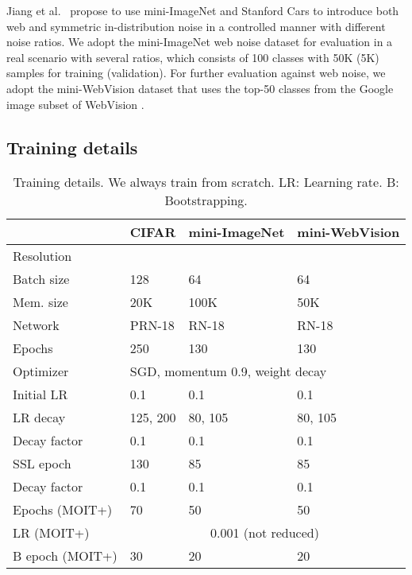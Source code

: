 \documentclass[final]{cvpr}
\begin{document}
Jiang et al.~\cite{2020_ICML_DatasetOOD} propose to use mini-ImageNet and Stanford Cars to introduce both web and symmetric in-distribution
noise in a controlled manner with different noise ratios. We adopt the mini-ImageNet web noise dataset for evaluation in a real scenario with several ratios, which consists of 100 classes with 50K (5K) samples for training (validation). For further evaluation against web noise, we adopt the mini-WebVision dataset \cite{2020_ICLR_DivideMix} that uses the top-50 classes from the Google image subset of WebVision \cite{2017_arXiv_WebVision}.

\subsection{Training details}

\begin{table}[!t]
\centering{}\caption{\label{tab:Training-details}Training details. We always train from
scratch. LR: Learning rate. B: Bootstrapping.}
\smallskip{}
\setlength{\tabcolsep}{3pt}{\small{}}\begin{tabular}{llll}
\toprule
 & {\small{}CIFAR} & {\small{}mini-ImageNet} & {\small{}mini-WebVision}\tabularnewline
\midrule
{\small{}Resolution} & {\small{}} & {\small{}} & {\small{}}\tabularnewline

{\small{}Batch size} & {\small{}128} & {\small{}64} & {\small{}64}\tabularnewline

{\small{}Mem. size} & {\small{}20K} & {\small{}100K} & {\small{}50K}\tabularnewline

{\small{}Network} & {\small{}PRN-18} & {\small{}RN-18} & {\small{}RN-18}\tabularnewline

{\small{}Epochs} & {\small{}250} & {\small{}130} & {\small{}130}\tabularnewline

{\small{}Optimizer} & \multicolumn{3}{l}{{\small{}SGD, momentum 0.9, weight decay  }}\tabularnewline

{\small{}Initial LR} & {\small{}0.1} & {\small{}0.1} & {\small{}0.1}\tabularnewline

{\small{}LR decay} & {\small{}125, 200} & {\small{}80, 105} & {\small{}80, 105}\tabularnewline

{\small{}Decay factor} & {\small{}0.1} & {\small{}0.1} & {\small{}0.1}\tabularnewline

{\small{}SSL epoch} & {\small{}130} & {\small{}85} & {\small{}85}\tabularnewline

{\small{}Decay factor} & {\small{}0.1} & {\small{}0.1} & {\small{}0.1}\tabularnewline

{\small{}Epochs (MOIT+)} & {\small{}70} & {\small{}50} & {\small{}50}\tabularnewline

{\small{}LR (MOIT+)} & \multicolumn{3}{c}{{\small{}0.001 (not reduced)}}\tabularnewline

{\small{}B epoch (MOIT+)} & {\small{}30} & {\small{}20} & {\small{}20}\tabularnewline
\bottomrule
\end{tabular}
\end{table}
\end{document}
